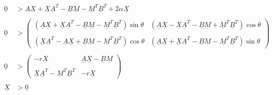 \begin{align}
    \begin{split}
        \underline{0} &> \underline{A}\underline{X} + \underline{X}\underline{A}^T - \underline{B}\underline{M} -\underline{M}^T\underline{B}^T + 2\alpha\underline{X}\\\\
        \underline{0} &>
        \begin{pmatrix}
            (\underline{A}\underline{X} + \underline{X}\underline{A}^T - \underline{B}\underline{M} - \underline{M}^T\underline{B}^T)\sin\theta & (\underline{A}\underline{X} - \underline{X}\underline{A}^T - \underline{B}\underline{M} + \underline{M}^T\underline{B}^T)\cos\theta \\\\
            (\underline{X}\underline{A}^T - \underline{A}\underline{X} + \underline{B}\underline{M} - \underline{M}^T\underline{B}^T)\cos\theta & (\underline{A}\underline{X} + \underline{X}\underline{A}^T - \underline{B}\underline{M} - \underline{M}^T\underline{B}^T)\sin\theta
        \end{pmatrix}\\\\
        \underline{0} &> 
        \begin{pmatrix}
            -r\underline{X} & \underline{A}\underline{X} - \underline{B}\underline{M} \\\\
            \underline{X}\underline{A}^T - \underline{M}^T\underline{B}^T & -r\underline{X}
        \end{pmatrix} \\\\
        \underline{X} &> \underline{0}
    \end{split}
    \label{eq:Gleichung7.6}
\end{align}

